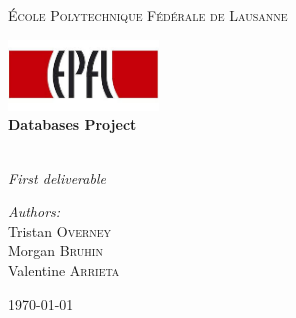 \begin{titlepage}
\begin{center}


\textsc{\LARGE \'Ecole Polytechnique Fédérale de Lausanne}

\includegraphics[width=0.3\textwidth]{EPFL_logo.jpg}~\\[5cm]

{ \huge \bfseries Databases Project \\[0.4cm] }

\HRule \\[0.4cm]

{ \huge \emph{First deliverable} \\[6cm] }

\noindent
\begin{minipage}{0.4\textwidth}
\begin{center} \large
\emph{Authors:}\\
Tristan \textsc{Overney}\\
Morgan \textsc{Bruhin}\\
Valentine \textsc{Arrieta}
\end{center}
\end{minipage}%


\vfill

{\large \today}

\end{center}
\end{titlepage}